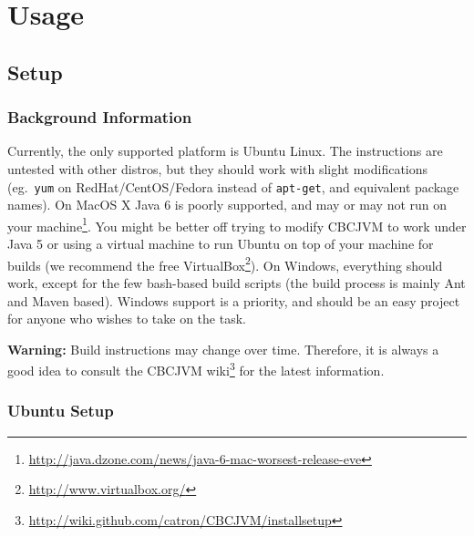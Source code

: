 \documentclass[10pt,letterpaper]{article}
\newcommand{\urlfootnote}[1]{\footnote{\url{#1}}}
\begin{document}
\pagebreak
\section{Usage}

\subsection{Setup}

\subsubsection{Background Information}

Currently, the only supported platform is Ubuntu Linux. The instructions are untested with other distros, but they should work with slight modifications (eg.\ \texttt{yum} on RedHat/CentOS/Fedora instead of \texttt{apt-get}, and equivalent package names). On MacOS X Java 6 is poorly supported, and may or may not run on your machine\urlfootnote{http://java.dzone.com/news/java-6-mac-worsest-release-eve}. You might be better off trying to modify CBCJVM to work under Java 5 or using a virtual machine to run Ubuntu on top of your machine for builds (we recommend the free VirtualBox\urlfootnote{http://www.virtualbox.org/}). On Windows, everything should work, except for the few bash-based build scripts (the build process is mainly Ant and Maven based). Windows support is a priority, and should be an easy project for anyone who wishes to take on the task.

\textbf{Warning: } Build instructions may change over time. Therefore, it is always a good idea to consult the CBCJVM wiki\urlfootnote{http://wiki.github.com/catron/CBCJVM/installsetup} for the latest information.

\subsubsection{Ubuntu Setup}
\end{document}
